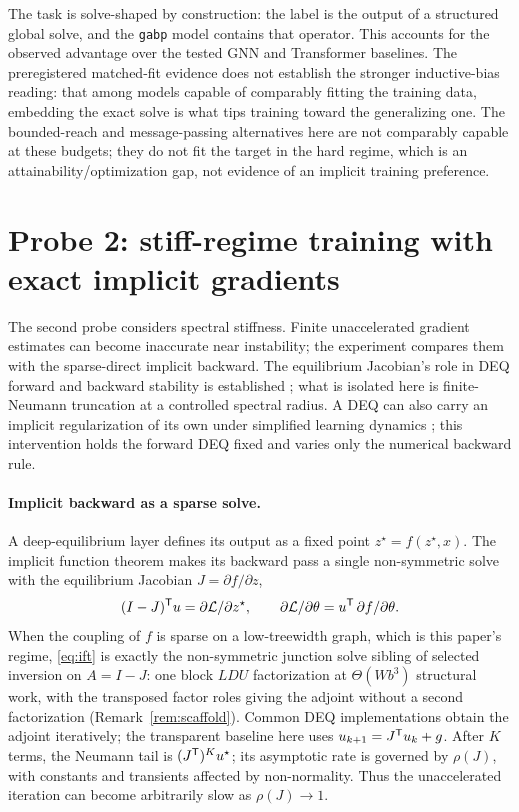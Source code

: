 The task is solve-shaped by construction: the label is the output of a
structured global solve, and the \texttt{gabp} model contains that operator.
This accounts for the observed advantage over the tested GNN and Transformer
baselines. The preregistered matched-fit evidence does not establish
the stronger inductive-bias reading: that among models capable of comparably
fitting the training data, embedding the exact solve is what tips training
toward the generalizing one. The bounded-reach and message-passing
alternatives here are not comparably capable at these budgets; they do not
fit the target in the hard regime, which is an attainability/optimization
gap, not evidence of an implicit training preference.

\section{Probe 2: stiff-regime training with exact implicit gradients}
\label{sec:deq}

The second probe considers spectral stiffness. Finite unaccelerated gradient
estimates can become inaccurate near instability; the experiment compares them
with the sparse-direct implicit backward. The equilibrium Jacobian's role in DEQ
forward and backward stability is established \citep{bai2021stabilizing}; what is
isolated here is finite-Neumann truncation at a controlled spectral radius. A DEQ
can also carry an implicit regularization of its own under simplified learning
dynamics \citep{wu2024separation}; this intervention holds the forward DEQ fixed
and varies only the numerical backward rule.

\paragraph{Implicit backward as a sparse solve.}
A deep-equilibrium layer defines its output as a fixed point
$z^\star = f(z^\star, x)$. The implicit function theorem makes its backward
pass a single non-symmetric solve with the equilibrium Jacobian
$J=\partial f/\partial z$,
\begin{equation}
  (I-J)^{\mathsf{T}} u = \partial\mathcal{L}/\partial z^\star,
  \qquad \partial\mathcal{L}/\partial\theta = u^{\mathsf{T}} \,\partial f/\partial\theta .
  \label{eq:ift}
\end{equation}
When the coupling of $f$ is sparse on a low-treewidth graph, which is this
paper's regime, \eqref{eq:ift} is exactly the non-symmetric junction solve
sibling of selected inversion on $A = I-J$: one block $LDU$ factorization at
$\Theta(Wb^3)$ structural work,
with the transposed factor roles giving the adjoint without a second factorization
(Remark~\ref{rem:scaffold}). Common DEQ implementations obtain the adjoint
iteratively; the transparent baseline here uses
$u_{k+1} = J^{\mathsf{T}} u_k + g$. After $K$ terms, the
Neumann tail is $(J^{\mathsf{T}})^K u^\star$; its asymptotic rate is governed by
$\rho(J)$, with constants and transients affected by non-normality. Thus the
unaccelerated iteration can become arbitrarily slow as $\rho(J)\to1$.

